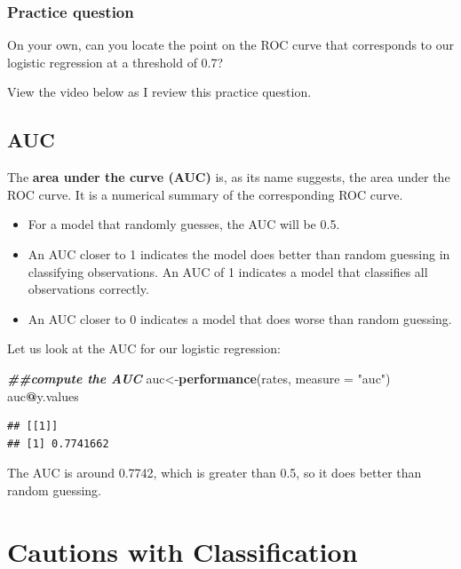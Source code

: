 \documentclass[
]{book}
\newenvironment{Shaded}{\begin{snugshade}}{\end{snugshade}}
\newcommand{\AttributeTok}[1]{\textcolor[rgb]{0.13,0.29,0.53}{#1}}
\newcommand{\DocumentationTok}[1]{\textcolor[rgb]{0.56,0.35,0.01}{\textbf{\textit{#1}}}}
\newcommand{\FunctionTok}[1]{\textcolor[rgb]{0.13,0.29,0.53}{\textbf{#1}}}
\newcommand{\NormalTok}[1]{#1}
\newcommand{\OtherTok}[1]{\textcolor[rgb]{0.56,0.35,0.01}{#1}}
\newcommand{\SpecialCharTok}[1]{\textcolor[rgb]{0.81,0.36,0.00}{\textbf{#1}}}
\newcommand{\StringTok}[1]{\textcolor[rgb]{0.31,0.60,0.02}{#1}}
\providecommand{\tightlist}{%
  \setlength{\itemsep}{0pt}\setlength{\parskip}{0pt}}
\begin{document}
\hypertarget{practice-question-4}{%
\subsubsection{Practice question}\label{practice-question-4}}

On your own, can you locate the point on the ROC curve that corresponds to our logistic regression at a threshold of 0.7?

View the video below as I review this practice question.

\hypertarget{auc}{%
\subsection{AUC}\label{auc}}

The \textbf{area under the curve (AUC)} is, as its name suggests, the area under the ROC curve. It is a numerical summary of the corresponding ROC curve.

\begin{itemize}
\tightlist
\item
  For a model that randomly guesses, the AUC will be 0.5.
\item
  An AUC closer to 1 indicates the model does better than random guessing in classifying observations. An AUC of 1 indicates a model that classifies all observations correctly.
\item
  An AUC closer to 0 indicates a model that does worse than random guessing.
\end{itemize}

Let us look at the AUC for our logistic regression:

\begin{Shaded}
\begin{Highlighting}[]
\DocumentationTok{\#\#compute the AUC}
\NormalTok{auc}\OtherTok{\textless{}{-}}\FunctionTok{performance}\NormalTok{(rates, }\AttributeTok{measure =} \StringTok{"auc"}\NormalTok{)}
\NormalTok{auc}\SpecialCharTok{@}\NormalTok{y.values}
\end{Highlighting}
\end{Shaded}

\begin{verbatim}
## [[1]]
## [1] 0.7741662
\end{verbatim}

The AUC is around 0.7742, which is greater than 0.5, so it does better than random guessing.

\hypertarget{cautions-with-classification}{%
\section{Cautions with Classification}\label{cautions-with-classification}}
\end{document}
